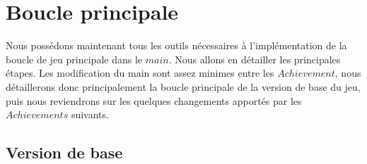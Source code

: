 \documentclass{article}
\begin{document}
\section{Boucle principale}
Nous possédons maintenant tous les outils nécessaires à l'implémentation de la boucle de jeu principale dans le $main$. Nous allons en détailler les principales étapes. Les modification du main sont assez minimes entre les $Achievement$, nous détaillerons donc principalement la boucle principale de la version de base du jeu, puis nous reviendrons sur les quelques changements apportés par les $Achievements$ suivants.

\subsection{Version de base}
\end{document}
